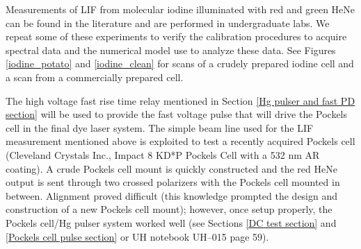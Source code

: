 Measurements of LIF from molecular iodine illuminated with red and green HeNe can be found in the literature and are performed in undergraduate labs. We repeat some of these experiments to verify the calibration procedures to acquire spectral data and the numerical model use to analyze these data. See Figures \ref{iodine_potato} and \ref{iodine_clean} for scans of a crudely prepared iodine cell and a scan from a commercially prepared cell.



The high voltage fast rise time relay mentioned in Section \ref{Hg pulser and fast PD section} will be used to provide the fast voltage pulse that will drive the Pockels cell in the final dye laser system. The simple beam line used for the LIF measurement mentioned above is exploited to test a recently acquired Pockels cell (Cleveland Crystals Inc., Impact 8 KD*P Pockels Cell with a 532 nm AR coating). A crude Pockels cell mount is quickly constructed and the red HeNe output is sent through two crossed polarizers with the Pockels cell mounted in between. Alignment proved difficult (this knowledge prompted the design and construction of a new Pockels cell mount); however, once setup properly, the Pockels cell/Hg pulser system worked well (see Sections \ref{DC test section} and \ref{Pockels cell pulse section} or UH notebook UH--015 page 59). 
